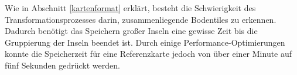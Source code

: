 Wie in Abschnitt \ref{kartenformat} erklärt, besteht die Schwierigkeit des
Transformationsprozesses darin, zusammenliegende Bodentiles zu
erkennen. Dadurch benötigt das Speichern großer Inseln eine gewisse Zeit bis die
Gruppierung der Inseln beendet ist. Durch einige Performance-Optimierungen
konnte die Speicherzeit für eine Referenzkarte jedoch von über einer Minute auf fünf
Sekunden gedrückt werden.
